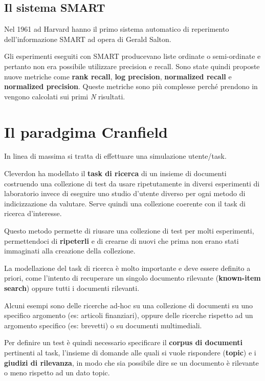 \subsection{Il sistema SMART}

Nel 1961 ad Harvard hanno il primo sistema automatico di reperimento dell'informazione SMART ad opera di Gerald Salton.

Gli esperimenti eseguiti con SMART producevano liste ordinate o semi-ordinate e pertanto non era possibile utilizzare precision e recall. 
Sono state quindi proposte nuove metriche come \textbf{rank recall}, \textbf{log precision}, \textbf{normalized recall} e \textbf{normalized precision}. Queste metriche sono più complesse perché prendono in vengono calcolati sui primi \textit{N} risultati. 

\section{Il paradgima Cranfield}

In linea di massima si tratta di effettuare una simulazione utente/task.

Cleverdon ha modellato il \textbf{task di ricerca} di un insieme di documenti costruendo una collezione di test da usare ripetutamente in diversi esperimenti di laboratorio invece di eseguire uno studio d'utente diverso per ogni metodo di indicizzazione da valutare.
Serve quindi una collezione coerente con il task di ricerca d'interesse.

Questo metodo permette di riusare una collezione di test per molti esperimenti, permettendoci di \textbf{ripeterli} e di crearne di nuovi che prima non erano stati immaginati alla creazione della collezione.

La modellazione del task di ricerca è molto importante e deve essere definito a priori, come l'intento di recuperare un singolo documento rilevante (\textbf{known-item search}) oppure tutti i documenti rilevanti.

Alcuni esempi sono delle ricerche ad-hoc su una collezione di documenti su uno specifico argomento (es: articoli finanziari), oppure delle ricerche rispetto ad un argomento specifico (es: brevetti) o su documenti multimediali.

Per definire un test è quindi necessario specificare il \textbf{corpus di documenti} pertinenti al task, l'insieme di domande alle quali si vuole rispondere (\textbf{topic}) e i \textbf{giudizi di rilevanza}, in modo che sia possibile dire se un documento è rilevante o meno rispetto ad un dato topic.

